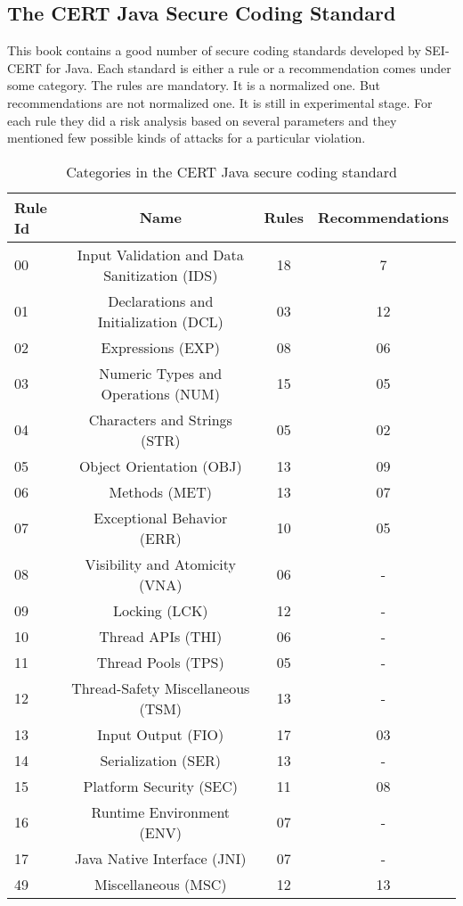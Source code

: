 \subsection{The CERT Java Secure Coding Standard}
	This book \cite{cert-java} contains a good number of secure coding standards developed by SEI-CERT for Java. Each standard is either a rule or a recommendation comes under some category. The rules are mandatory. It is a normalized one. But recommendations are not normalized one. It is still in experimental stage. For each rule they did a risk analysis based on several parameters and they mentioned few possible kinds of attacks for a particular violation.
	
	\begin{table}[h!]
		\centering
		
		\label{tab:table1}
		\begin{tabular}{l|c|c|c}
			\textbf{Rule Id} & \textbf{Name} & \textbf{Rules} & \textbf{Recommendations}\\
			\hline
			00 & Input Validation and Data Sanitization (IDS) & 18 & 7\\
			\hline
			01 & Declarations and Initialization (DCL) & 03 & 12\\
			\hline
			02 & Expressions (EXP) & 08 & 06\\
			\hline
			03 & Numeric Types and Operations (NUM) & 15 & 05\\
			\hline
			04 & Characters and Strings (STR) & 05 & 02\\
			\hline
			05 & Object Orientation (OBJ) & 13 & 09\\
			\hline
			06 & Methods (MET) & 13 & 07\\
			\hline
			07 & Exceptional Behavior (ERR) & 10 & 05\\
			\hline
			08 & Visibility and Atomicity (VNA) & 06 & -\\
			\hline
			09 & Locking (LCK) & 12 & -\\
			\hline
			10 & Thread APIs (THI) & 06 & -\\
			\hline
			11 & Thread Pools (TPS) & 05 & -\\
			\hline
			12 & Thread-Safety Miscellaneous (TSM) & 13 & -\\
			\hline
			13 & Input Output (FIO) & 17 & 03\\
			\hline
			14 & Serialization (SER) & 13 & -\\
			\hline
			15 & Platform Security (SEC) & 11 & 08\\
			\hline
			16 & Runtime Environment (ENV) & 07 & -\\
			\hline
			17 & Java Native Interface (JNI) & 07 & -\\
			\hline
			49 & Miscellaneous (MSC) & 12 & 13\\
			\hline
			
		\end{tabular}
		\caption{Categories in the CERT Java secure coding standard}
	\end{table}
